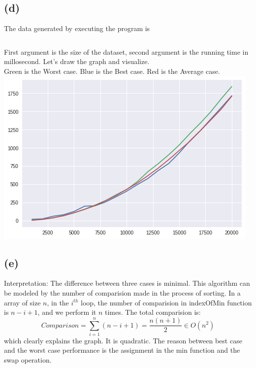 \documentclass{article}
\begin{document}
\subsection*{(d)}
The data generated by executing the program is
\inputminted{Python}{plot.py}
First argument is the size of the dataset, second argument is the running time in millosecond.
Let's draw the graph and visualize. \\
Green is the Worst case.
Blue is the Best case.
Red is the Average case. \\
\includegraphics[scale=0.7]{plot.png}

\subsection*{(e)}
Interpretation:
The difference between three cases is minimal.
This algorithm can be modeled by the number of comparision made in the process of sorting.
In a array of size $ n $, in the $ i^{th} $ loop, the number of comparision in indexOfMin function
is $n - i + 1$, and we perform it $ n $ times. The total comparision is:
$$
Comparison = \sum_{i = 1}^{n} (n - i + 1) = \frac{n ( n + 1)}{2} \in O(n^2)
$$
which clearly explains the graph. It is quadratic.
The reason between best case and the worst case performance is the assignment in the min function and the swap operation.
\end{document}
